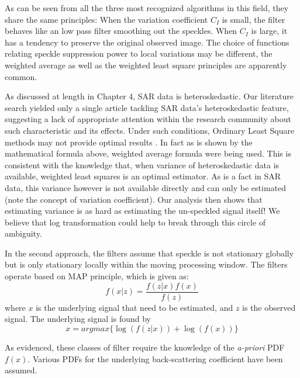 As can be seen from all the three most recognized algorithms in this field, they share the same principles:
When the variation coefficient $C_I$ is small, the filter behaves like an low pass filter smoothing out the speckles. 
When $C_I$ is large, it has a tendency to preserve the original observed image.
The choice of functions relating speckle suppression power to local variations may be different, 
	the weighted average as well as the weighted least square principles are apparently common.

As discussed at length in Chapter 4, SAR data is heteroskedastic.
Our literature search yielded only a single article \cite{Amirmazlaghani_2009_TIP} tackling SAR data's heteroskedastic feature, suggesting a lack of appropriate attention within the research community about such characteristic and its effects.
Under such conditions, Ordinary Least Square methods may not provide optimal results \cite{Woods_PAMI_1984}. 
In fact as is shown by the mathematical formula above, weighted average formula were being used.
This is consistent with the knowledge that, when variance of heteroskedastic data is available, weighted least squares is an optimal estimator.
As is a fact in SAR data, this variance however is not available directly and can only be estimated (note the concept of variation coefficient).
Our analysis then shows that estimating variance is as hard as estimating the un-speckled signal itself!
We believe that log transformation could help to break through this circle of ambiguity.

In the second approach, the filters assume that speckle is not stationary globally but is only stationary locally within the moving processing window.
The filters operate based on MAP principle, which is given as:
\begin{equation}
f(x|z) = \frac{f(z|x) f(x)}{f(z)}
\end{equation}
where
	$x$ is the underlying signal that need to be estimated, and
	$z$ is the observed signal.
The underlying signal is found by
\begin{equation}
x = argmax \{ \log(f(z|x)) + \log(f(x))  \} 
\end{equation}

As evidenced, these classes of filter require the knowledge of the \textit{a-priori} PDF $f(x)$. 
Various PDFs for the underlying back-scattering coefficient have been assumed. 

